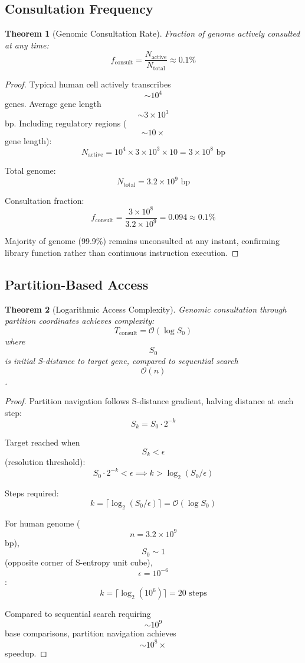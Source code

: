 \documentclass[11pt,twocolumn,a4paper]{article}
\newtheorem{theorem}{Theorem}[section]
\theoremstyle{remark}
\begin{document}
\subsection{Consultation Frequency}

\begin{theorem}[Genomic Consultation Rate]
\label{thm:consultation_rate}
Fraction of genome actively consulted at any time:
$$
f_{\mathrm{consult}} = \frac{N_{\mathrm{active}}}{N_{\mathrm{total}}} \approx 0.1\%
$$
\end{theorem}

\begin{proof}
Typical human cell actively transcribes $$\sim 10^4$$ genes. Average gene length $$\sim 3 \times 10^3$$ bp. Including regulatory regions ($$\sim 10\times$$ gene length):
$$
N_{\mathrm{active}} = 10^4 \times 3 \times 10^3 \times 10 = 3 \times 10^8 \text{ bp}
$$

Total genome:
$$
N_{\mathrm{total}} = 3.2 \times 10^9 \text{ bp}
$$

Consultation fraction:
$$
f_{\mathrm{consult}} = \frac{3 \times 10^8}{3.2 \times 10^9} = 0.094 \approx 0.1\%
$$

Majority of genome (99.9\%) remains unconsulted at any instant, confirming library function rather than continuous instruction execution.
\end{proof}

\subsection{Partition-Based Access}

\begin{theorem}[Logarithmic Access Complexity]
\label{thm:log_access}
Genomic consultation through partition coordinates achieves complexity:
$$
T_{\mathrm{consult}} = \mathcal{O}(\log S_0)
$$
where $$S_0$$ is initial S-distance to target gene, compared to sequential search $$\mathcal{O}(n)$$.
\end{theorem}

\begin{proof}
Partition navigation follows S-distance gradient, halving distance at each step:
$$
S_k = S_0 \cdot 2^{-k}
$$

Target reached when $$S_k < \epsilon$$ (resolution threshold):
$$
S_0 \cdot 2^{-k} < \epsilon \implies k > \log_2(S_0/\epsilon)
$$

Steps required:
$$
k = \lceil \log_2(S_0/\epsilon) \rceil = \mathcal{O}(\log S_0)
$$

For human genome ($$n = 3.2 \times 10^9$$ bp), $$S_0 \sim 1$$ (opposite corner of S-entropy unit cube), $$\epsilon = 10^{-6}$$:
$$
k = \lceil \log_2(10^6) \rceil = 20 \text{ steps}
$$

Compared to sequential search requiring $$\sim 10^9$$ base comparisons, partition navigation achieves $$\sim 10^8\times$$ speedup.
\end{proof}
\end{document}
